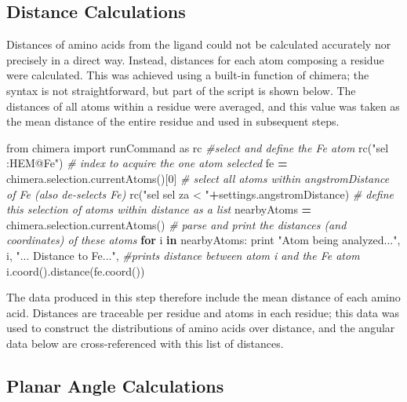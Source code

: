 \documentclass[a4paper, nobind]{templates/ociamthesis}
\newenvironment{Shaded}{\begin{snugshade}}{\end{snugshade}}
\newcommand{\BuiltInTok}[1]{#1}
\newcommand{\CommentTok}[1]{\textcolor[rgb]{0.56,0.35,0.01}{\textit{#1}}}
\newcommand{\ControlFlowTok}[1]{\textcolor[rgb]{0.13,0.29,0.53}{\textbf{#1}}}
\newcommand{\DecValTok}[1]{\textcolor[rgb]{0.00,0.00,0.81}{#1}}
\newcommand{\ImportTok}[1]{#1}
\newcommand{\KeywordTok}[1]{\textcolor[rgb]{0.13,0.29,0.53}{\textbf{#1}}}
\newcommand{\NormalTok}[1]{#1}
\newcommand{\OperatorTok}[1]{\textcolor[rgb]{0.81,0.36,0.00}{\textbf{#1}}}
\newcommand{\StringTok}[1]{\textcolor[rgb]{0.31,0.60,0.02}{#1}}
\renewenvironment{Shaded}
{
  \vspace{10pt}%
  \begin{snugshade}%
}{%
  \end{snugshade}%
  \vspace{8pt}%
}
\begin{document}
\hypertarget{distance-calculations}{%
\subsection{Distance Calculations}\label{distance-calculations}}

Distances of amino acids from the ligand could not be calculated accurately nor precisely in a direct way. Instead, distances for each atom composing a residue were calculated. This was achieved using a built-in function of chimera; the syntax is not straightforward, but part of the script is shown below. The distances of all atoms within a residue were averaged, and this value was taken as the mean distance of the entire residue and used in subsequent steps.

\begin{Shaded}
\begin{Highlighting}[]
\ImportTok{from}\NormalTok{ chimera }\ImportTok{import}\NormalTok{ runCommand }\ImportTok{as}\NormalTok{ rc}
\CommentTok{\#select and define the Fe atom}
\NormalTok{rc(}\StringTok{"sel :HEM@Fe"}\NormalTok{) }
\CommentTok{\# index to acquire the one atom selected}
\NormalTok{fe }\OperatorTok{=}\NormalTok{ chimera.selection.currentAtoms()[}\DecValTok{0}\NormalTok{] }
\CommentTok{\# select all atoms within angstromDistance of Fe (also de{-}selects Fe)}
\NormalTok{rc(}\StringTok{"sel sel za \textless{} "}\OperatorTok{+}\NormalTok{settings.angstromDistance) }
\CommentTok{\# define this selection of atoms within distance as a list}
\NormalTok{nearbyAtoms }\OperatorTok{=}\NormalTok{ chimera.selection.currentAtoms()}
\CommentTok{\# parse and print the distances (and coordinates) of these atoms }
\ControlFlowTok{for}\NormalTok{ i }\KeywordTok{in}\NormalTok{ nearbyAtoms:}
  \BuiltInTok{print} \StringTok{"Atom being analyzed..."}\NormalTok{, i, }\StringTok{"... Distance to Fe..."}\NormalTok{,}
  \CommentTok{\#prints distance between atom i and the Fe atom}
\NormalTok{  i.coord().distance(fe.coord())  }
\end{Highlighting}
\end{Shaded}

The data produced in this step therefore include the mean distance of each amino acid. Distances are traceable per residue and atoms in each residue; this data was used to construct the distributions of amino acids over distance, and the angular data below are cross-referenced with this list of distances.

\hypertarget{planar-angle-calculations}{%
\subsection{Planar Angle Calculations}\label{planar-angle-calculations}}
\end{document}
